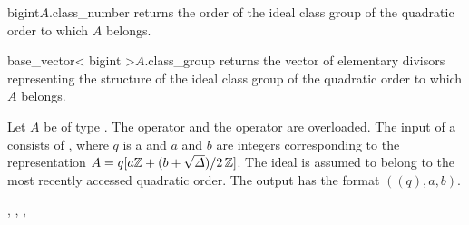 \begin{fcode}{bigint}{$A$.class_number}{}
  returns the order of the ideal class group of the quadratic order to which $A$ belongs.
\end{fcode}

\begin{fcode}{base_vector< bigint >}{$A$.class_group}{}
  returns the vector of elementary divisors representing the structure of the ideal class group
  of the quadratic order to which $A$ belongs.
\end{fcode}



\IO

Let $A$ be of type .  The  operator \code{>>} and the
 operator \code{<<} are overloaded.  The input of a 
consists of , where $q$ is a  and $a$ and $b$ are integers
corresponding to the representation $A = q [ a \mathbb{Z} + (b + \sqrt{\varDelta})/2 \, \mathbb{Z} ]$.  The ideal
is assumed to belong to the most recently accessed quadratic order.  The output has the format
$((q),a,b)$.



\SEEALSO

,
,
,






\EXAMPLES

